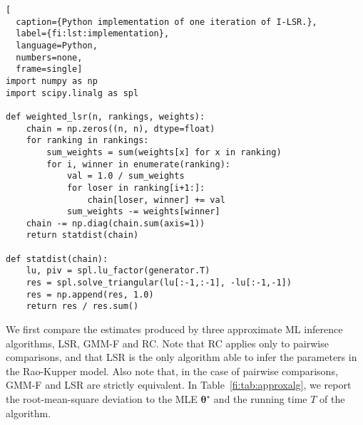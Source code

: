 \begin{lstlisting}[
  caption={Python implementation of one iteration of I-LSR.},
  label={fi:lst:implementation},
  language=Python,
  numbers=none,
  frame=single]
import numpy as np
import scipy.linalg as spl

def weighted_lsr(n, rankings, weights):
    chain = np.zeros((n, n), dtype=float)
    for ranking in rankings:
        sum_weights = sum(weights[x] for x in ranking)
        for i, winner in enumerate(ranking):
            val = 1.0 / sum_weights
            for loser in ranking[i+1:]:
                chain[loser, winner] += val
            sum_weights -= weights[winner]
    chain -= np.diag(chain.sum(axis=1))
    return statdist(chain)

def statdist(chain):
    lu, piv = spl.lu_factor(generator.T)
    res = spl.solve_triangular(lu[:-1,:-1], -lu[:-1,-1])
    res = np.append(res, 1.0)
    return res / res.sum()
\end{lstlisting}

We first compare the estimates produced by three approximate ML inference algorithms, LSR, GMM-F and RC.
Note that RC applies only to pairwise comparisons, and that LSR is the only algorithm able to infer the parameters in the Rao-Kupper model.
Also note that, in the case of pairwise comparisons, GMM-F and LSR are strictly equivalent.
In Table~\ref{fi:tab:approxalg}, we report the root-mean-square deviation to the MLE $\bm{\theta}^\star$ and the running time $T$ of the algorithm.

